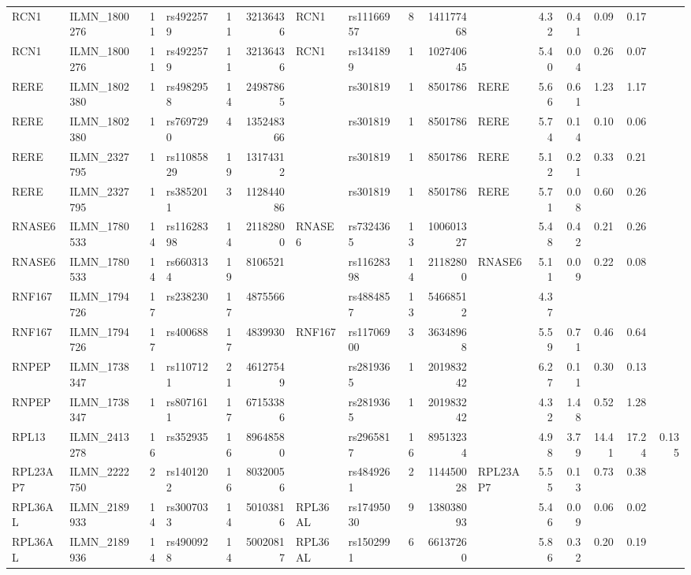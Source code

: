 \documentclass{article}
\begin{document}
\begin{landscape}
{\begin{ThreePartTable}
\begin{longtable}{|llr|lrrl|lrrl|rrrr|r|}
RCN1 & ILMN\_1800276 & 11 & rs4922579 & 11 & 32136436 & RCN1 & rs11166957 & 8 & 141177468 &  & 4.32 & 0.41 & 0.09 & 0.17 &  \\
RCN1 & ILMN\_1800276 & 11 & rs4922579 & 11 & 32136436 & RCN1 & rs1341899 & 1 & 102740645 &  & 5.40 & 0.04 & 0.26 & 0.07 &  \\
RERE & ILMN\_1802380 & 1 & rs4982958 & 14 & 24987865 &  & rs301819 & 1 & 8501786 & RERE & 5.66 & 0.61 & 1.23 & 1.17 &  \\
RERE & ILMN\_1802380 & 1 & rs7697290 & 4 & 135248366 &  & rs301819 & 1 & 8501786 & RERE & 5.74 & 0.14 & 0.10 & 0.06 &  \\
RERE & ILMN\_2327795 & 1 & rs11085829 & 19 & 13174312 &  & rs301819 & 1 & 8501786 & RERE & 5.12 & 0.21 & 0.33 & 0.21 &  \\
RERE & ILMN\_2327795 & 1 & rs3852011 & 3 & 112844086 &  & rs301819 & 1 & 8501786 & RERE & 5.71 & 0.08 & 0.60 & 0.26 &  \\
RNASE6 & ILMN\_1780533 & 14 & rs11628398 & 14 & 21182800 & RNASE6 & rs7324365 & 13 & 100601327 &  & 5.48 & 0.42 & 0.21 & 0.26 &  \\
RNASE6 & ILMN\_1780533 & 14 & rs6603134 & 19 & 8106521 &  & rs11628398 & 14 & 21182800 & RNASE6 & 5.11 & 0.09 & 0.22 & 0.08 &  \\
RNF167 & ILMN\_1794726 & 17 & rs238230 & 17 & 4875566 &  & rs4884857 & 13 & 54668512 &  & 4.37 &  &  &  &  \\
RNF167 & ILMN\_1794726 & 17 & rs400688 & 17 & 4839930 & RNF167 & rs11706900 & 3 & 36348968 &  & 5.59 & 0.71 & 0.46 & 0.64 &  \\
RNPEP & ILMN\_1738347 & 1 & rs1107121 & 21 & 46127549 &  & rs2819365 & 1 & 201983242 &  & 6.27 & 0.11 & 0.30 & 0.13 &  \\
RNPEP & ILMN\_1738347 & 1 & rs8071611 & 17 & 67153386 &  & rs2819365 & 1 & 201983242 &  & 4.32 & 1.48 & 0.52 & 1.28 &  \\
RPL13 & ILMN\_2413278 & 16 & rs352935 & 16 & 89648580 &  & rs2965817 & 16 & 89513234 &  & 4.98 & 3.79 & 14.41 & 17.24 & 0.135 \\
RPL23AP7 & ILMN\_2222750 & 2 & rs1401202 & 16 & 80320056 &  & rs4849261 & 2 & 114450028 & RPL23AP7 & 5.55 & 0.13 & 0.73 & 0.38 &  \\
RPL36AL & ILMN\_2189933 & 14 & rs3007033 & 14 & 50103816 & RPL36AL & rs17495030 & 9 & 138038093 &  & 5.46 & 0.09 & 0.06 & 0.02 &  \\
RPL36AL & ILMN\_2189936 & 14 & rs4900928 & 14 & 50020817 & RPL36AL & rs1502991 & 6 & 66137260 &  & 5.86 & 0.32 & 0.20 & 0.19 &  \\

\end{longtable}
\end{ThreePartTable}}
\end{landscape}
\end{document}
